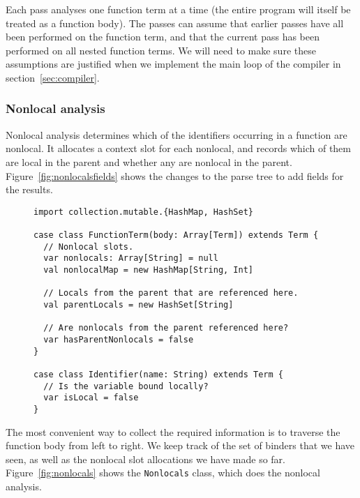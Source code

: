 Each pass analyses one function term at a time
(the entire program will itself be treated as a function body).
The passes can assume that earlier passes
have all been performed on the function term,
and that the current pass has been performed on all nested function terms.
We will need to make sure these assumptions are justified
when we implement the main loop of the compiler in section~\ref{sec:compiler}.


\subsubsection{Nonlocal analysis\label{sec:nonlocals}}

Nonlocal analysis determines
which of the identifiers occurring in a function are nonlocal.
It allocates a context slot for each nonlocal,
and records which of them are local in the parent
and whether any are nonlocal in the parent.
Figure~\ref{fig:nonlocalsfields} shows the changes to the parse tree
to add fields for the results.

\begin{figure}
\begin{verbatim}
import collection.mutable.{HashMap, HashSet}

case class FunctionTerm(body: Array[Term]) extends Term {
  // Nonlocal slots.
  var nonlocals: Array[String] = null
  val nonlocalMap = new HashMap[String, Int]

  // Locals from the parent that are referenced here.
  val parentLocals = new HashSet[String]

  // Are nonlocals from the parent referenced here?
  var hasParentNonlocals = false
}

case class Identifier(name: String) extends Term {
  // Is the variable bound locally?
  var isLocal = false
}
\end{verbatim}
\getcaption
\end{figure}

The most convenient way to collect the required information
is to traverse the function body from left to right.
We keep track of the set of binders that we have seen,
as well as the nonlocal slot allocations we have made so far.
Figure~\ref{fig:nonlocals} shows the \verb!Nonlocals! class,
which does the nonlocal analysis.

